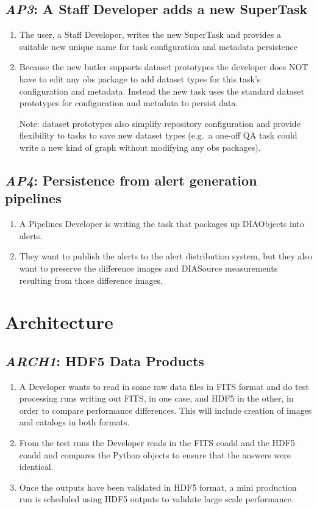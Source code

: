 \documentclass[DM,toc,lsstdraft]{lsstdoc}
\newcommand{\usecase}[3]{%
\subsection{\emph{#1}: #2}
\label{use:#1}
\begin{enumerate}[label=\alph*.]
#3
\end{enumerate}
}
\begin{document}
\usecase{AP3}{A Staff Developer adds a new SuperTask}{%

\item
The user, a Staff Developer, writes the new SuperTask and provides a suitable new unique name for task configuration and metadata persistence

\item
Because the new butler supports dataset prototypes the developer does NOT have to edit any obs package to add dataset types for this task's configuration and metadata.
Instead the new task uses the standard dataset prototypes for configuration and metadata to persist data.

Note: dataset prototypes also simplify repository configuration and provide flexibility to tasks to save new dataset types (e.g.\ a one-off QA task could write a new kind of graph without modifying any obs packages).

}

\usecase{AP4}{Persistence from alert generation pipelines}{%

\item
A Pipelines Developer is writing the task that packages up DIAObjects into alerts.

\item
They want to publish the alerts to the alert distribution system, but they also want to preserve the difference images and DIASource measurements resulting from those difference images.

}

\section{Architecture}

\usecase{ARCH1}{HDF5 Data Products}{%

\item
A Developer wants to read in some raw data files in FITS format and do test processing runs writing out FITS, in one case, and HDF5 in the other, in order to compare performance differences.
This will include creation of images and catalogs in both formats.

\item
From the test runs the Developer reads in the FITS coadd and the HDF5 coadd and compares the Python objects to ensure that the answers were identical.

\item
Once the outputs have been validated in HDF5 format, a mini production run is scheduled using HDF5 outputs to validate large scale performance.
}
\end{document}
